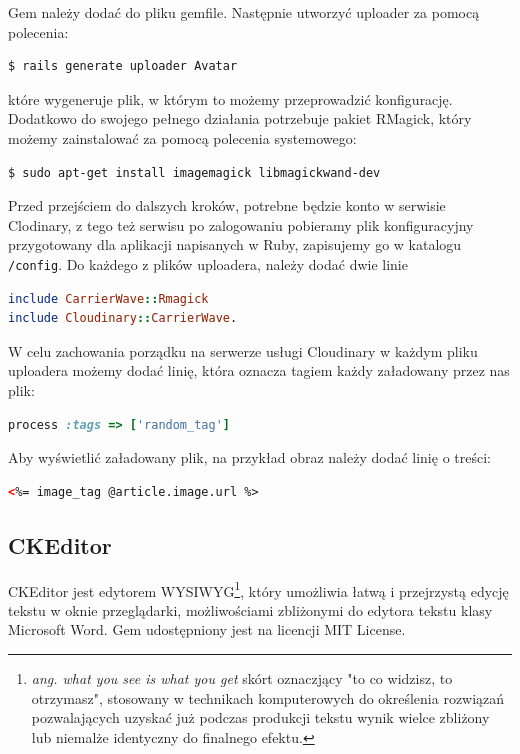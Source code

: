 \documentclass[openright]{xmgr}
\begin{document}
Gem należy dodać do pliku gemfile. Następnie utworzyć uploader za pomocą polecenia: 
\begin{lstlisting}[language=bash]
$ rails generate uploader Avatar
\end{lstlisting}
które wygeneruje plik, w którym to możemy przeprowadzić konfigurację. Dodatkowo do swojego pełnego działania potrzebuje pakiet RMagick, który możemy zainstalować za pomocą polecenia systemowego:
\begin{lstlisting}[language=bash, caption={Polecenie instalujące oprogramowanie RMagick}]
$ sudo apt-get install imagemagick libmagickwand-dev
\end{lstlisting}
Przed przejściem do dalszych kroków, potrebne będzie konto w serwisie Clodinary, z tego też serwisu po zalogowaniu pobieramy plik konfiguracyjny przygotowany dla aplikacji napisanych w Ruby, zapisujemy go w katalogu \texttt{/config}. Do każdego z plików uploadera, należy dodać dwie linie 
\begin{lstlisting}[language=ruby, caption={Framgent zawartości pliku uploadera}]
include CarrierWave::Rmagick
include Cloudinary::CarrierWave.
\end{lstlisting}

\newpage

W celu zachowania porządku na serwerze usługi Cloudinary w każdym pliku uploadera możemy dodać linię, która oznacza tagiem każdy załadowany przez nas plik: 
\begin{lstlisting}[language=ruby, caption={Przykładowy tag dla pliku}]
process :tags => ['random_tag']
\end{lstlisting}
Aby wyświetlić załadowany plik, na przykład obraz należy dodać linię o treści: 
\begin{lstlisting}[language=html, caption={Kod wyświetlający obraz}]
<%= image_tag @article.image.url %>
\end{lstlisting}

\subsection{CKEditor}
CKEditor \cite{ckeditor} jest edytorem WYSIWYG\footnote{\textit{ang. what you see is what you get} skórt oznaczjący "to co widzisz, to otrzymasz", stosowany w technikach komputerowych do określenia rozwiązań pozwalających uzyskać już podczas produkcji tekstu wynik wielce zbliżony lub niemalże identyczny do finalnego efektu.}, który umożliwia łatwą i przejrzystą edycję tekstu w oknie przeglądarki, możliwościami zbliżonymi do edytora tekstu klasy Microsoft Word. Gem udostępniony jest na licencji MIT License. 
\end{document}
